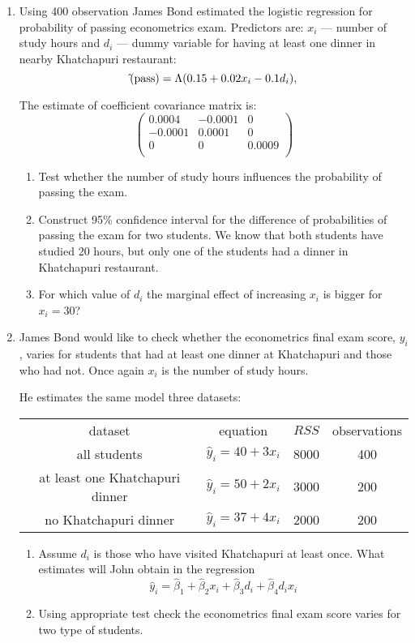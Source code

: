 \documentclass[12pt]{article}
\let\P\relax
\DeclareMathOperator{\P}{\mathbb{P}}
\begin{document}
\begin{enumerate}
\item Using 400 observation James Bond estimated the logistic regression for probability
of passing econometrics exam. Predictors are: $x_i$ — number of study hours and $d_i$ —
dummy variable for having at least one dinner in nearby Khatchapuri restaurant:
\[
\hat \P(\text{pass}) = \Lambda(0.15 + 0.02x_i - 0.1 d_i),
\]

The estimate of coefficient covariance matrix is:
\[
\begin{pmatrix}
0.0004 & -0.0001 & 0 \\
-0.0001 & 0.0001 & 0 \\
0 & 0 & 0.0009 \\
\end{pmatrix}
\]

\begin{enumerate}
  \item Test whether the number of study hours influences the probability of passing the exam.
  \item Construct 95\% confidence interval for the difference of probabilities of passing the exam
	for two students. We know that both students have studied 20 hours, but only one of the students
	had a dinner in Khatchapuri restaurant.
  \item For which value of $d_i$ the marginal effect of increasing $x_i$ is bigger for $x_i = 30$?
\end{enumerate}

\item James Bond would like to check whether the econometrics final exam score, $y_i$, varies for
students that had at least one dinner at Khatchapuri and those who had not. Once again
$x_i$ is the number of study hours.

He estimates the same model three datasets:


\begin{tabular}{cccc}
	\toprule
	dataset & equation & $RSS$ & observations \\
	all students & $\hat y_i = 40 + 3x_i$ & 8000 & 400 \\
	at least one Khatchapuri dinner & $\hat y_i = 50 + 2x_i$ & 3000 & 200 \\
	no Khatchapuri dinner & $\hat y_i = 37 + 4x_i$ & 2000 & 200 \\
	\bottomrule
\end{tabular}

\begin{enumerate}
	\item Assume $d_i$ is those who have visited Khatchapuri at least once.
	What estimates will John obtain in the regression
	\[
    \hat y_i = \hat \beta_1 + \hat \beta_2 x_i + \hat \beta_3 d_i + \hat\beta_4 d_i x_i
	\]
	\item Using appropriate test check the econometrics final exam score varies for two type of students.
\end{enumerate}



\end{enumerate}
\end{document}
